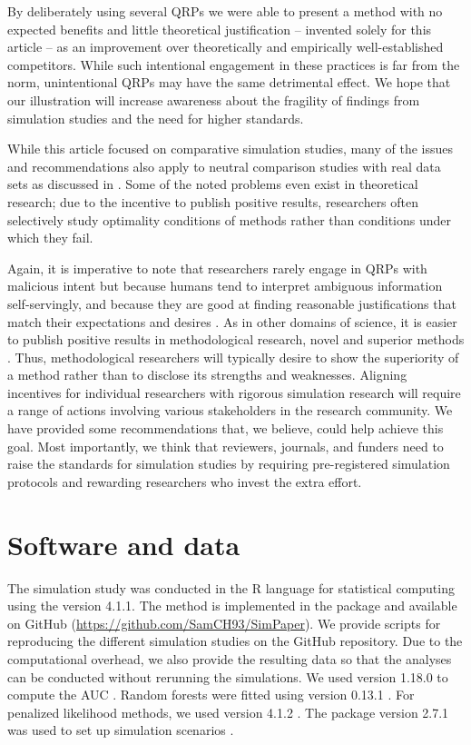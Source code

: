 \documentclass[a4paper, 11pt]{article}
\begin{document}
By deliberately using several QRPs we were able to present a method with no expected 
benefits and little theoretical justification -- invented solely for this article -- as an
improvement over theoretically and empirically well-established competitors.
While such intentional engagement in these practices is far from the norm, unintentional QRPs may have the same detrimental effect.
We hope that our illustration will increase awareness about the fragility of
findings from simulation studies and the need for higher standards.

While this article focused on comparative simulation studies, many of the issues
and recommendations also apply to neutral comparison studies with real data sets 
as discussed in \citet{Niessl2021}. Some of the noted problems even exist in 
theoretical research; due to the incentive to publish positive results, researchers
often selectively study optimality conditions of methods rather than conditions 
under which they fail.

Again, it is imperative to note that researchers rarely engage in QRPs with malicious 
intent but because humans tend to interpret ambiguous information self-servingly, and 
because they are good at finding reasonable justifications that match their expectations 
and desires \citep{Simmons2011}. As in other domains of science, it is easier to publish 
positive results in methodological research, \ie novel and superior methods
\citep{Boulesteix2015}. Thus, methodological 
researchers will typically desire to show the superiority of a method rather than 
to disclose its strengths and weaknesses. Aligning incentives for
individual researchers with rigorous simulation research will require a range of
actions involving various stakeholders in the research community. 
We have provided some recommendations that, we believe, could help achieve this goal.
Most importantly, we think that reviewers, journals, and funders need to raise 
the standards for simulation studies by requiring pre-registered simulation protocols
and rewarding researchers who invest the extra effort.

\section*{Software and data}
The simulation study was conducted in the \textsf{R} language for statistical
computing \citep{pkg:base} using the version 4.1.1. The method
\ainet{} is implemented in the  package and available on GitHub 
(\url{https://github.com/SamCH93/SimPaper}). We provide scripts for
reproducing the different simulation studies on the GitHub repository.
Due to the computational overhead, we also provide the resulting data 
so that the analyses can be conducted without rerunning the simulations.
We used  version 1.18.0 to compute the AUC \citep{pkg:proc}.
Random forests were fitted using  version 0.13.1 \citep{ranger2017}.
For penalized likelihood methods, we used  version 4.1.2
\citep{Friedman2010,Simon2011}.
The  package version 2.7.1 was used to set up simulation scenarios
\citep{Chalmers2020}.
\end{document}
